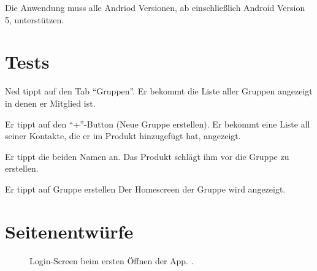 \documentclass[parskip=full,11pt]{scrartcl}
\begin{document}
Die Anwendung muss alle Andriod Versionen, ab einschließlich Android Version 5, unterstützen.



\section{Tests}


{Ned tippt auf den Tab  \enquote{Gruppen}.}
{Er bekommt die Liste aller Gruppen angezeigt in denen er Mitglied ist.}

{Er tippt auf den \enquote{+}-Button (Neue Gruppe erstellen).}
{Er bekommt eine Liste all seiner Kontakte, die er im Produkt hinzugefügt hat, angezeigt.}

{Er tippt die beiden Namen an.}
{Das Produkt schlägt ihm vor die Gruppe zu erstellen.}

{Er tippt auf Gruppe erstellen}
{Der Homescreen der Gruppe wird angezeigt.} %

\pagebreak
\appendix

\section{Seitenentwürfe}


\begin{figure}[hb]
	\caption{\label{fig:menu}
		Login-Screen beim ersten Öffnen der App.
		 .
	}
\end{figure}
\end{document}
